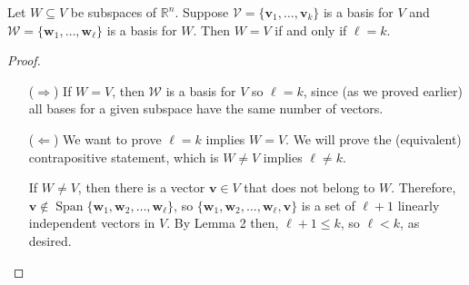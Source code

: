 \documentclass{article}
\newcommand{\R}{\ensuremath{\mathbb{R}}}
\newcommand{\Span}{\ensuremath{\operatorname{Span}}}
\newcommand{\sV}{\ensuremath{\mathcal{V}}}
\newcommand{\sW}{\ensuremath{\mathcal{W}}}
\newcommand{\vw}{\ensuremath{\mathbf{w}}}
\newcommand{\vv}{\ensuremath{\mathbf{v}}}
\begin{document}
Let $W \subseteq V$ be subspaces of $\R^n$.
Suppose $\sV = \{\mathbf{v}_1,\dots, \mathbf{v}_k\}$ is a basis for
$V$ and $\sW = \{\mathbf{w}_1,\dots, \mathbf{w}_\ell\}$ is a basis for $W$.
Then $W = V$ if and only if $\ell = k$.

\begin{proof}\
  \begin{itemize}
  \item[($\Rightarrow$)]
  If $W = V$, then $\sW$ is a basis for $V$ so $\ell = k$, since (as we proved
  earlier) all bases for a given subspace have the same number of vectors.

  \item[($\Leftarrow$)] We want to prove $\ell=k$ implies $W = V$.
  We will prove the (equivalent) contrapositive statement, which is
  $W \neq V$ implies $\ell\neq k$.


  If $W \neq V$, then there is a vector $\vv \in V$ that does not belong to $W$.
  Therefore, $\vv \notin \Span \{\vw_1, \vw_2, \dots, \vw_\ell\}$, so
  $\{\vw_1, \vw_2, \dots, \vw_\ell, \vv\}$ is a set of $\ell + 1$ linearly independent
  vectors in $V$.  By Lemma 2 then, $\ell + 1 \leq k$, so $\ell < k$, as desired.
  
  \end{itemize}
\end{proof}
\end{document}
